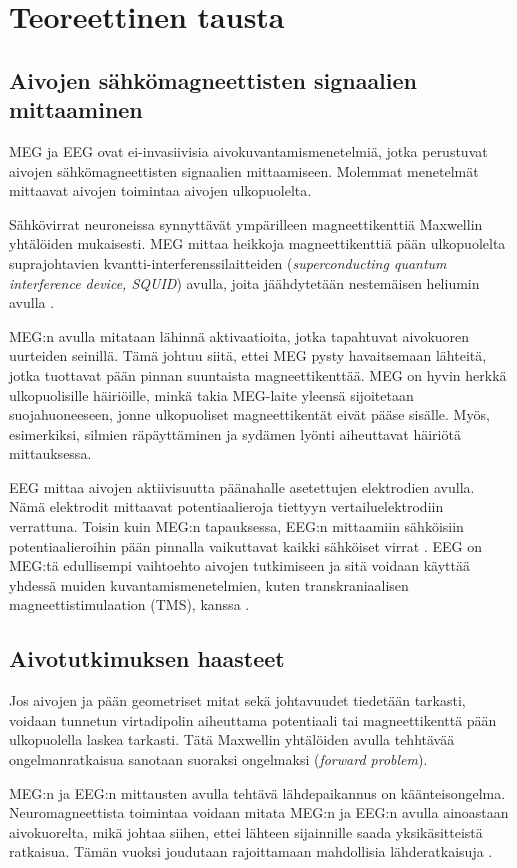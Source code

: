 \section{Teoreettinen tausta}



\subsection{Aivojen sähkömagneettisten signaalien mittaaminen}
MEG ja EEG ovat ei-invasiivisia aivokuvantamismenetelmiä, jotka perustuvat aivojen sähkömagneettisten signaalien mittaamiseen. Molemmat menetelmät mittaavat aivojen toimintaa aivojen ulkopuolelta.

Sähkövirrat neuroneissa synnyttävät ympärilleen magneettikenttiä Maxwellin yhtälöiden mukaisesti. MEG mittaa heikkoja magneettikenttiä pään ulkopuolelta suprajohtavien kvantti-interferenssilaitteiden (\textit{superconducting quantum interference device, SQUID}) avulla, joita jäähdytetään nestemäisen heliumin avulla \citep{HariMEGprimer}.

MEG:n avulla mitataan lähinnä aktivaatioita, jotka tapahtuvat aivokuoren uurteiden seinillä. Tämä johtuu siitä, ettei MEG pysty havaitsemaan lähteitä, jotka tuottavat pään pinnan suuntaista magneettikenttää. \citep{hansen2010meg} MEG on hyvin herkkä ulkopuolisille häiriöille, minkä takia MEG-laite yleensä sijoitetaan suojahuoneeseen, jonne ulkopuoliset magneettikentät eivät pääse sisälle. Myös, esimerkiksi, silmien räpäyttäminen ja sydämen lyönti aiheuttavat häiriötä mittauksessa. \citep{Hamalainen1993MagnetoencephalographytheoryBrain}

EEG mittaa aivojen aktiivisuutta päänahalle asetettujen elektrodien avulla. Nämä elektrodit mittaavat potentiaalieroja tiettyyn vertailuelektrodiin verrattuna. \citep{Michel2004EEGImaging} Toisin kuin MEG:n tapauksessa, EEG:n mittaamiin sähköisiin potentiaalieroihin pään pinnalla vaikuttavat kaikki sähköiset virrat \citep{HariMEGprimer}. EEG on MEG:tä edullisempi vaihtoehto aivojen tutkimiseen ja sitä voidaan käyttää yhdessä muiden kuvantamismenetelmien, kuten transkraniaalisen magneettistimulaation (TMS), kanssa \citep[s. 11]{HariMEGprimer}. 

\subsection{Aivotutkimuksen haasteet}
Jos aivojen ja pään geometriset mitat sekä johtavuudet tiedetään tarkasti, voidaan tunnetun virtadipolin aiheuttama potentiaali tai magneettikenttä pään ulkopuolella laskea tarkasti. Tätä Maxwellin yhtälöiden avulla tehhtävää ongelmanratkaisua sanotaan suoraksi ongelmaksi (\textit{forward problem}). \citep{Hamalainen1993MagnetoencephalographytheoryBrain}

MEG:n ja EEG:n mittausten avulla tehtävä lähdepaikannus on käänteisongelma. Neuromagneettista toimintaa voidaan mitata MEG:n ja EEG:n avulla ainoastaan aivokuorelta, mikä johtaa siihen, ettei lähteen sijainnille saada yksikäsitteistä ratkaisua. Tämän vuoksi joudutaan rajoittamaan mahdollisia lähderatkaisuja \citep[s. 2]{hansen2010meg}.

